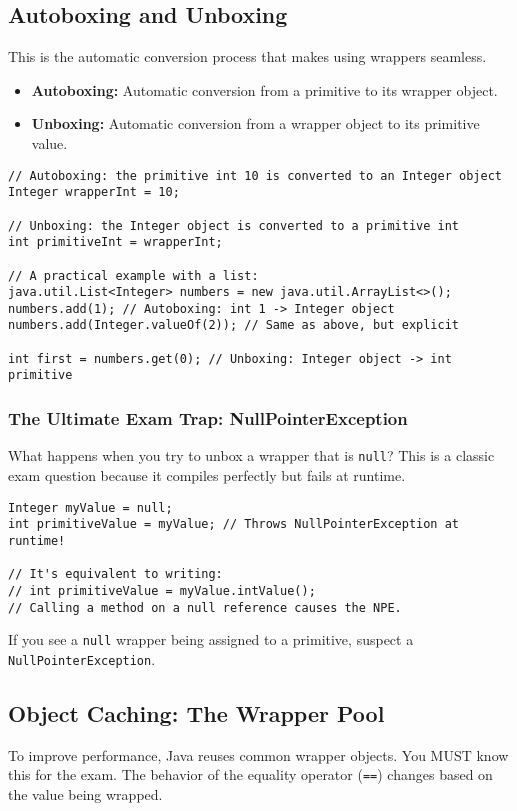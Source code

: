 \documentclass[12pt]{article}
\begin{document}
\begin{enumerate}[label=(\arabic*)]
\subsection*{Autoboxing and Unboxing}
This is the automatic conversion process that makes using wrappers seamless.
\begin{itemize}
\item \textbf{Autoboxing:} Automatic conversion from a primitive to its wrapper object.
\item \textbf{Unboxing:} Automatic conversion from a wrapper object to its primitive value.
\end{itemize}

\begin{verbatim}
// Autoboxing: the primitive int 10 is converted to an Integer object
Integer wrapperInt = 10;

// Unboxing: the Integer object is converted to a primitive int
int primitiveInt = wrapperInt;

// A practical example with a list:
java.util.List<Integer> numbers = new java.util.ArrayList<>();
numbers.add(1); // Autoboxing: int 1 -> Integer object
numbers.add(Integer.valueOf(2)); // Same as above, but explicit

int first = numbers.get(0); // Unboxing: Integer object -> int primitive
\end{verbatim}

\subsubsection*{The Ultimate Exam Trap: NullPointerException}
What happens when you try to unbox a wrapper that is \texttt{null}? This is a classic exam question because it compiles perfectly but fails at runtime.
\begin{verbatim}
Integer myValue = null;
int primitiveValue = myValue; // Throws NullPointerException at runtime!

// It's equivalent to writing:
// int primitiveValue = myValue.intValue();
// Calling a method on a null reference causes the NPE.
\end{verbatim}
If you see a \texttt{null} wrapper being assigned to a primitive, suspect a \texttt{NullPointerException}.

\subsection*{Object Caching: The Wrapper Pool}
To improve performance, Java reuses common wrapper objects. You MUST know this for the exam. The behavior of the equality operator (\texttt{==}) changes based on the value being wrapped.


\end{enumerate}
\end{document}
